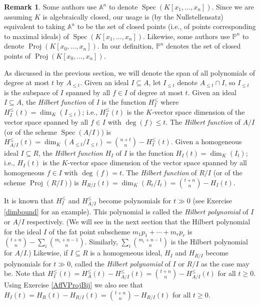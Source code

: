 \documentclass[11pt,twoside]{amsart}
\numberwithin{equation}{section}
\theoremstyle{definition}
\newtheorem{remark}[theorem]{Remark}
\begin{document}
\begin{remark}
Some authors use ${\mathbb{A}^{{n}}}$ to denote ${\operatorname{Spec}}({K}[x_1,\ldots,x_n])$.
Since we are assuming ${K}$ is algebraically closed,
our usage is (by the Nullstellensatz) equivalent to taking ${\mathbb{A}^{{n}}}$ to be the set of 
closed points (i.e., of points corresponding to maximal ideals)
of ${\operatorname{Spec}}({K}[x_1,\ldots,x_n])$. Likewise,
some authors use ${\mathbb{P}^{{n}}}$ to denote ${\operatorname{Proj}}({K}[x_0,\ldots,x_n])$.
In our definition, ${\mathbb{P}^{{n}}}$ denotes the set of closed points 
of ${\operatorname{Proj}}({K}[x_0,\ldots,x_n])$.
\end{remark}

As discussed in the previous section, 
we will denote the span of all polynomials of degree at most $t$ by $A_{\leq t}$.
Given an ideal $I\subseteq A$, let $I_{\leq t}$ denote $A_{\leq t}\cap I$, so
$I_{\leq t}$ is the subspace of $I$ spanned by all $f\in I$ of degree at most $t$.
Given an ideal $I\subseteq A$, the \emph{Hilbert function} of $I$ is the function $H^\leq_I$ where
$H^\leq_I(t)=\dim_{K} (I_{\leq t})$; i.e., $H^\leq_I(t)$
is the ${K}$-vector space dimension of the vector space spanned by all $f\in I$ with 
$\deg(f)\leq t$. The \emph{Hilbert function} of $A/I$ (or of the scheme ${\operatorname{Spec}}(A/I)$) is 
$H^\leq_{A/I}(t)=\dim_{K}(A_{\leq t}/I_{\leq t})=\binom{n+t}{n}-H^\leq_I(t)$.
Given a homogeneous ideal $I\subseteq R$, the \emph{Hilbert function} $H_I$
of $I$ is the function $H_I(t)=\dim_{K} (I_t)$; i.e., $H_I(t)$
is the ${K}$-vector space dimension of the vector space 
spanned by all homogeneous $f\in I$ with 
$\deg(f)=t$. The \emph{Hilbert function} of $R/I$ (or of the scheme ${\operatorname{Proj}}(R/I)$) is 
$H_{R/I}(t)=\dim_{K}(R_t/I_t)=\binom{t+n}{n}-H_I(t)$.

It is known that $H^\leq_{I}$ and $H^\leq_{A/I}$ become polynomials for $t\gg0$
(see Exercise \ref{dimbound} for an example). This polynomial 
is called the \emph{Hilbert polynomial} of $I$ or $A/I$ respectively. 
(We will see in the next section that the Hilbert polynomial for the ideal $I$ of the fat point 
subscheme $m_1p_1+\cdots+m_rp_r$
is $\binom{t+n}{n}-\sum_i\binom{m_i+n-1}{n}$.
Similarly, $\sum_i\binom{m_i+n-1}{n}$
is the Hilbert polynomial for $A/I$.)
Likewise, if $I\subseteq R$ is a homogeneous ideal, $H_I$ and $H_{R/I}$
become polynomials for $t\gg0$, called the \emph{Hilbert polynomial} of $I$ or $R/I$
as the case may be. Note that
$H^{\leq}_I(t)=H^{\leq}_A(t)-H^{\leq}_{A/I}(t)=\binom{t+n}{n}-H^{\leq}_{A/I}(t)$
for all $t\geq 0$. Using Exercise \ref{AffVProjBij} we also see that
$H_I(t)=H_R(t)-H_{R/I}(t)=\binom{t+n}{n}-H_{R/I}(t)$
for all $t\geq 0$. 
\end{document}
